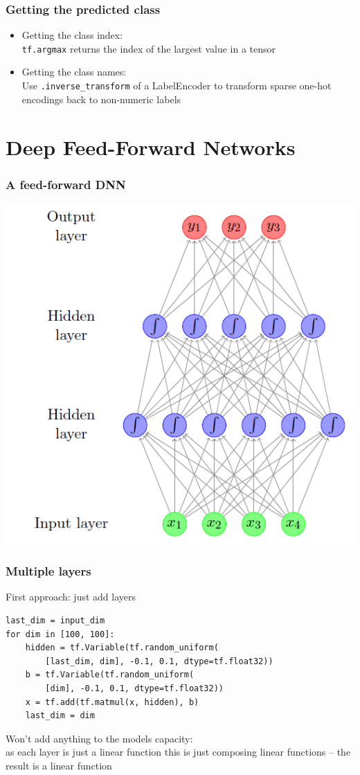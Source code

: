 \documentclass{beamer}
\begin{document}
\begin{frame}
  \frametitle{Getting the predicted class}

  \begin{itemize}
  \item Getting the class index:\\
    \lstinline{tf.argmax} returns the index of the largest value in a tensor\pause
  \item Getting the class names:\\
    Use \lstinline{.inverse_transform} of a LabelEncoder to transform sparse
    one-hot encodings back to non-numeric labels
  \end{itemize}
  
\end{frame}

\section{Deep Feed-Forward Networks}

\begin{frame}
  \frametitle{A feed-forward DNN}
  \begin{center}
    \includegraphics[height=30ex]{03-goldberg-ffn.png}
  \end{center}
\end{frame}

\begin{frame}[fragile]
  \frametitle{Multiple layers}

  First approach: just add layers
  \begin{footnotesize}
\begin{lstlisting}
last_dim = input_dim
for dim in [100, 100]:
    hidden = tf.Variable(tf.random_uniform(
        [last_dim, dim], -0.1, 0.1, dtype=tf.float32))
    b = tf.Variable(tf.random_uniform(
        [dim], -0.1, 0.1, dtype=tf.float32))
    x = tf.add(tf.matmul(x, hidden), b)
    last_dim = dim
\end{lstlisting}
  \end{footnotesize}
  \pause 
  Won't add anything to the models capacity:\\
  as each layer is just a linear function this is just composing linear
  functions -- the result is a linear function

\end{frame}
\end{document}
